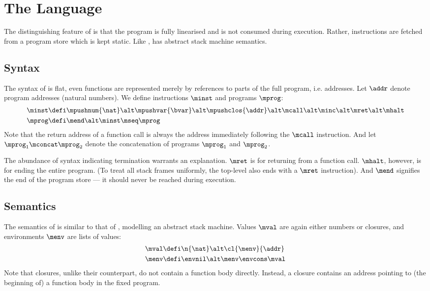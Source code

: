 \clearpage

\section{The \textnormal{\mlang} Language}

The distinguishing feature of \mlang is that the program is fully linearised and is not consumed during execution.
Rather, instructions are fetched from a program store which is kept static.
Like \slang, \mlang has abstract stack machine semantics.

\subsection{Syntax}

The syntax of \mlang is flat, even functions are represented merely by references to parts of the full program, i.e. addresses.
Let $\addr$ denote program addresses (natural numbers).
We define \mlang instructions $\minst$ and programs $\mprog$:
\begin{align*}
  \minst &\defi \mpushnum{\nat} \alt \mpushvar{\bvar} \alt \mpushclos{\addr} \alt \mcall \alt \minc \alt \mret \alt \mhalt \\
  \mprog &\defi \mend \alt \minst \mseq \mprog
\end{align*}
Note that the return address of a function call is always the address immediately following the $\mcall$ instruction.
And let $\mprog_1 \mconcat \mprog_2$ denote the concatenation of programs $\mprog_1$ and $\mprog_2$.

The abundance of syntax indicating termination warrants an explanation.
$\mret$ is for returning from a function call.
$\mhalt$, however, is for ending the entire program.
(To treat all stack frames uniformly, the top-level also ends with a $\mret$ instruction).
And $\mend$ signifies the end of the program store --- it should never be reached during execution.


\subsection{Semantics}

The semantics of \mlang is similar to that of \slang, modelling an abstract stack machine.
Values $\mval$ are again either numbers or closures, and environments $\menv$ are lists of values:
\begin{align*}
  \mval &\defi \n{\nat} \alt \cl{\menv}{\addr} \\
  \menv &\defi \envnil \alt \menv \envcons \mval
\end{align*}
Note that \mlang closures, unlike their \slang counterpart, do not contain a function body directly.
Instead, a closure contains an address pointing to (the beginning of) a function body in the fixed program.

